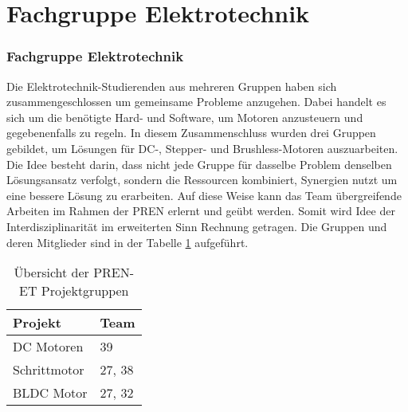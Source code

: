 \ifSTANDALONE
\section{Fachgruppe Elektrotechnik}
\fi
\ifEMBED
\subsubsection{Fachgruppe Elektrotechnik}
\label{chap:Fachgruppe Elektrotechnik}
\fi
Die Elektrotechnik-Studierenden aus mehreren Gruppen haben sich
zusammengeschlossen um gemeinsame Probleme anzugehen. Dabei handelt es sich
um die benötigte Hard- und Software, um Motoren anzusteuern
und gegebenenfalls zu regeln. In diesem Zusammenschluss wurden drei Gruppen
gebildet, um Lösungen für DC-, Stepper- und Brushless-Motoren auszuarbeiten.
Die Idee besteht darin, dass nicht jede Gruppe für dasselbe Problem
denselben Lösungsansatz verfolgt, sondern die Ressourcen kombiniert,
Synergien nutzt um eine bessere Lösung zu erarbeiten. Auf diese Weise kann
das Team übergreifende Arbeiten im Rahmen der PREN erlernt und
geübt werden. Somit wird Idee der Interdisziplinarität im erweiterten Sinn
Rechnung getragen. Die Gruppen und deren Mitglieder sind in der Tabelle 
\ref{tab:pren-et-overview} aufgeführt.
\begin{table}[h!]
	\centering
	\begin{tabular}{l l}
		Projekt		& Team \\
		\hline
		DC Motoren	& 39 \\
		Schrittmotor	& 27, 38 \\
		BLDC Motor	& 27, 32 \\
	\end{tabular}
	\caption{Übersicht der PREN-ET Projektgruppen}
	\label{tab:pren-et-overview}
\end{table}
